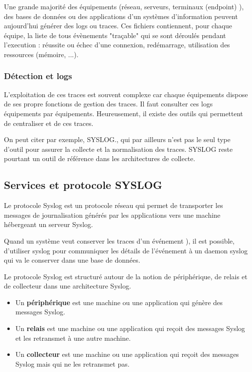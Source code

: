 
Une grande majorité des équipements (réseau, serveurs, terminaux (endpoint) ), des bases de données ou des applications d’un systèmes d'information peuvent aujourd’hui générer des logs ou traces.  Ces fichiers contiennent, pour chaque équipe, la liste de tous évènements  "traçable" qui se sont déroulés pendant l'execution : réussite ou échec d’une connexion, redémarrage, utilisation des ressources (mémoire, ...).

\begin{frame}
\frametitle<presentation>{Détection et logs}

\end{frame}
L'exploitation de ces traces est souvent complexe car chaque équipements dispose de ses propre fonctions de gestion des traces. Il faut consulter ces logs équipements par équipements. Heureusement, il existe des outils qui permettent de centraliser et de  ces traces.

On peut citer par exemple, SYSLOG., qui par ailleurs n'est pas le seul type d'outil pour assurer la collecte et la normalisation des traces. SYSLOG reste pourtant un outil de référence dans les architectures de collecte.

\subsection{Services et protocole SYSLOG}

Le protocole Syslog est un protocole réseau qui permet de transporter les messages de journalisation générés par les applications vers une machine hébergeant un serveur Syslog. 

Quand un système veut conserver les traces d'un événement ),  il est possible, d'utiliser syslog pour communiquer les détails de l'événement à un daemon syslog qui va le conserver dans une base de données.

Le protocole Syslog est structuré autour de la notion de périphérique, de relais et de collecteur dans une architecture Syslog.

\begin{itemize}
  \item Un \textbf{périphérique} est une machine ou une application qui génère des messages Syslog.
  \item Un \textbf{relais} est une machine ou une application qui reçoit des messages Syslog et les retransmet à une autre machine.
  \item Un \textbf{collecteur} est une machine ou une application qui reçoit des messages Syslog mais qui ne les retransmet pas.
\end{itemize}

